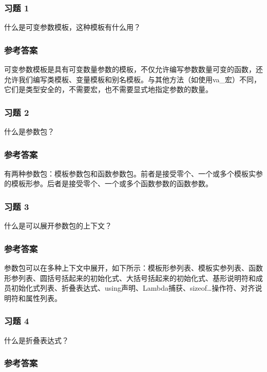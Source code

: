 \subsubsection{习题 1}

什么是可变参数模板，这种模板有什么用？

\subsubsection{参考答案}

可变参数模板是具有可变数量参数的模板，不仅允许编写参数数量可变的函数，还允许我们编写类模板、变量模板和别名模板。与其他方法（如使用va\_宏）不同，它们是类型安全的，不需要宏，也不需要显式地指定参数的数量。


\subsubsection{习题 2}

什么是参数包？

\subsubsection{参考答案}

有两种参数包：模板参数包和函数参数包。前者是接受零个、一个或多个模板实参的模板形参。后者是接受零个、一个或多个函数参数的函数参数。

\subsubsection{习题 3}

什么是可以展开参数包的上下文？

\subsubsection{参考答案}

参数包可以在多种上下文中展开，如下所示：模板形参列表、模板实参列表、函数形参列表、圆括号括起来的初始化式、大括号括起来的初始化式、基形说明符和成员初始化式列表、折叠表达式、using声明、Lambda捕获、sizeof…操作符、对齐说明符和属性列表。

\subsubsection{习题 4}

什么是折叠表达式？

\subsubsection{参考答案}

